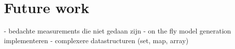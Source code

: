 \section{Future work}
- bedachte measurements die niet gedaan zijn
- on the fly model generation implementeren
- complexere datastructuren (set, map, array)
